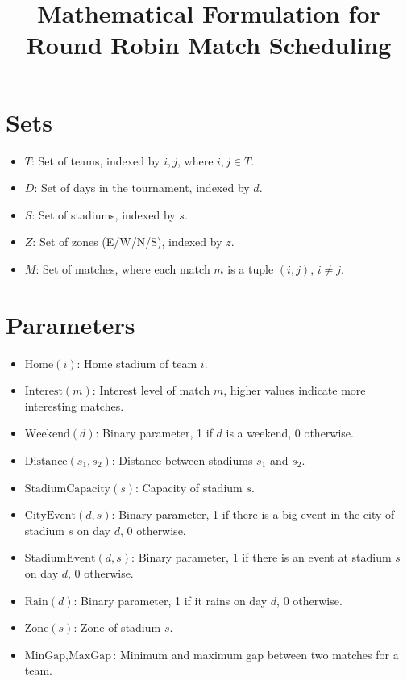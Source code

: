 \documentclass[a4paper, 12pt]{article}
\title{Mathematical Formulation for Round Robin Match Scheduling}
\author{}
\date{}
\begin{document}
\maketitle

\section*{Sets}
\begin{itemize}
    \item $T$: Set of teams, indexed by $i, j$, where $i, j \in T$.
    \item $D$: Set of days in the tournament, indexed by $d$.
    \item $S$: Set of stadiums, indexed by $s$.
    \item $Z$: Set of zones (E/W/N/S), indexed by $z$.
    \item $M$: Set of matches, where each match $m$ is a tuple $(i, j)$, $i \neq j$.
\end{itemize}

\section*{Parameters}
\begin{itemize}
    \item $\text{Home}(i)$: Home stadium of team $i$.
    \item $\text{Interest}(m)$: Interest level of match $m$, higher values indicate more interesting matches.
    \item $\text{Weekend}(d)$: Binary parameter, 1 if $d$ is a weekend, 0 otherwise.
    \item $\text{Distance}(s_1, s_2)$: Distance between stadiums $s_1$ and $s_2$.
    \item $\text{StadiumCapacity}(s)$: Capacity of stadium $s$.
    \item $\text{CityEvent}(d, s)$: Binary parameter, 1 if there is a big event in the city of stadium $s$ on day $d$, 0 otherwise.
    \item $\text{StadiumEvent}(d, s)$: Binary parameter, 1 if there is an event at stadium $s$ on day $d$, 0 otherwise.
    \item $\text{Rain}(d)$: Binary parameter, 1 if it rains on day $d$, 0 otherwise.
    \item $\text{Zone}(s)$: Zone of stadium $s$.
    \item $\text{MinGap}, \text{MaxGap}$: Minimum and maximum gap between two matches for a team.
\end{itemize}
\end{document}
